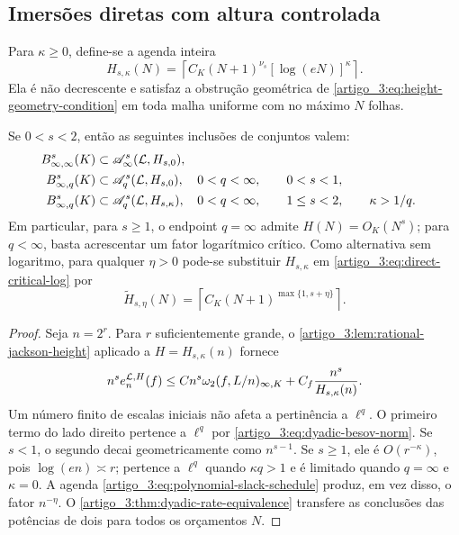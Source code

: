 \subsection{Imersões diretas com altura controlada}

Para $\kappa\ge0$, define-se a agenda inteira
\begin{equation}
 H_{s,\kappa}(N)
 =\left\lceil C_K(N+1)^{\nu_s}
        [\log(eN)]^\kappa\right\rceil.
 \label{artigo_3:eq:corrected-height-schedule}
\end{equation}
Ela é não decrescente e satisfaz a obstrução geométrica de
\eqref{artigo_3:eq:height-geometry-condition} em toda malha uniforme com no máximo
$N$ folhas.

\begin{theorem}\label{map:artigo_3:4.2}
\label{artigo_3:thm:direct-besov-height}
Se $0<s<2$, então as seguintes inclusões de conjuntos valem:
\begin{align}
 B^s_{\infty,\infty}(K)
 &\subset
 \mathscr A^s_\infty(\mathcal{L},H_{s,0}),
 \label{artigo_3:eq:direct-endpoint}\\
 B^s_{\infty,q}(K)
 &\subset
 \mathscr A^s_q(\mathcal{L},H_{s,0}),
 &&0<q<\infty,\qquad 0<s<1,
 \label{artigo_3:eq:direct-subcritical}\\
 B^s_{\infty,q}(K)
 &\subset
 \mathscr A^s_q(\mathcal{L},H_{s,\kappa}),
 &&0<q<\infty,\qquad 1\le s<2,\qquad\kappa>1/q.
 \label{artigo_3:eq:direct-critical-log}
\end{align}
Em particular, para $s\ge1$, o endpoint $q=\infty$ admite
$H(N)=O_K(N^s)$; para $q<\infty$, basta acrescentar um fator logarítmico
crítico. Como
alternativa sem logaritmo, para qualquer $\eta>0$ pode-se substituir
$H_{s,\kappa}$ em \eqref{artigo_3:eq:direct-critical-log} por
\begin{equation}
 \widetilde H_{s,\eta}(N)
 =\left\lceil C_K(N+1)^{\max\{1,s+\eta\}}\right\rceil.
 \label{artigo_3:eq:polynomial-slack-schedule}
\end{equation}
\end{theorem}

\begin{proof}
Seja $n=2^r$. Para $r$ suficientemente grande, o
\cref{artigo_3:lem:rational-jackson-height} aplicado a
$H=H_{s,\kappa}(n)$ fornece
\begin{equation}
 n^s e_n^{\mathcal{L},H}(f)
 \le C n^s\omega_2(f,L/n)_{\infty,K}
     +C_f\frac{n^s}{H_{s,\kappa}(n)}.
 \label{artigo_3:eq:direct-sequence-bound}
\end{equation}
Um número finito de escalas iniciais não afeta a pertinência a $\ell^q$. O
primeiro termo do lado direito pertence a $\ell^q$ por
\eqref{artigo_3:eq:dyadic-besov-norm}. Se $s<1$, o segundo decai geometricamente como
$n^{s-1}$. Se $s\ge1$, ele é $O(r^{-\kappa})$, pois
$\log(en)\asymp r$; pertence a $\ell^q$ quando $\kappa q>1$ e é limitado
quando $q=\infty$ e $\kappa=0$. A agenda
\eqref{artigo_3:eq:polynomial-slack-schedule} produz, em vez disso, o fator
$n^{-\eta}$. O \cref{artigo_3:thm:dyadic-rate-equivalence} transfere as conclusões
das potências de dois para todos os orçamentos $N$.
\end{proof}

